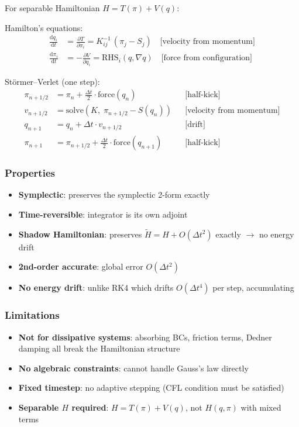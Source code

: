 For separable Hamiltonian $H = T(\pi) + V(q)$:

Hamilton's equations:
\begin{align}
  \frac{\mathrm{d}q_i}{\mathrm{d}t} &= \frac{\partial T}{\partial \pi_i} = K^{-1}_{ij}\,(\pi_j - S_j) \quad \text{[velocity from momentum]} \\
  \frac{\mathrm{d}\pi_i}{\mathrm{d}t} &= -\frac{\partial V}{\partial q_i} = \mathrm{RHS}_i(q, \nabla q) \quad \text{[force from configuration]}
\end{align}

St\"ormer--Verlet (one step):
\begin{align}
  \pi_{n+1/2} &= \pi_n + \frac{\Delta t}{2} \cdot \mathrm{force}(q_n) && \text{[half-kick]} \\
  v_{n+1/2} &= \mathrm{solve}(K,\; \pi_{n+1/2} - S(q_n)) && \text{[velocity from momentum]} \\
  q_{n+1} &= q_n + \Delta t \cdot v_{n+1/2} && \text{[drift]} \\
  \pi_{n+1} &= \pi_{n+1/2} + \frac{\Delta t}{2} \cdot \mathrm{force}(q_{n+1}) && \text{[half-kick]}
\end{align}

\subsubsection{Properties}
\label{sec:verlet-properties}

\begin{itemize}
  \item \textbf{Symplectic}: preserves the symplectic 2-form exactly
  \item \textbf{Time-reversible}: integrator is its own adjoint
  \item \textbf{Shadow Hamiltonian}: preserves $\tilde{H} = H + O(\Delta t^2)$ exactly $\to$ no energy drift
  \item \textbf{2nd-order accurate}: global error $O(\Delta t^2)$
  \item \textbf{No energy drift}: unlike RK4 which drifts $O(\Delta t^4)$ per step, accumulating
\end{itemize}

\subsubsection{Limitations}
\label{sec:verlet-limitations}

\begin{itemize}
  \item \textbf{Not for dissipative systems}: absorbing BCs, friction terms, Dedner damping
    all break the Hamiltonian structure
  \item \textbf{No algebraic constraints}: cannot handle Gauss's law directly
  \item \textbf{Fixed timestep}: no adaptive stepping (CFL condition must be satisfied)
  \item \textbf{Separable $H$ required}: $H = T(\pi) + V(q)$, not $H(q, \pi)$ with mixed terms
\end{itemize}

